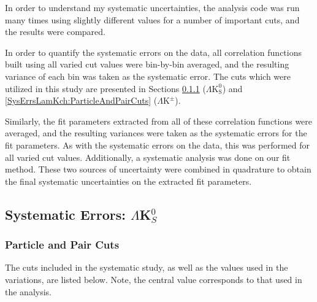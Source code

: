 \documentclass[ALICE,manyauthors]{cernphprep}
\newcommand{\LamKpm}{$\Lambda\mathrm{K^{\pm}}$\xspace}
\newcommand{\LamKs}{$\Lambda\mathrm{K^{0}_{S}}$\xspace}
\begin{document}
In order to understand my systematic uncertainties, the analysis code was run many times using slightly different values for a number of important cuts, and the results were compared.

In order to quantify the systematic errors on the data, all correlation functions built using all varied cut values were bin-by-bin averaged, and the resulting variance of each bin was taken as the systematic error.  The cuts which were utilized in this study are presented in Sections \ref{SysErrsLamK0:ParticleAndPairCuts} (\LamKs) and \ref{SysErrsLamKch:ParticleAndPairCuts} (\LamKpm).


Similarly, the fit parameters extracted from all of these correlation functions were averaged, and the resulting variances were taken as the systematic errors for the fit parameters.
As with the systematic errors on the data, this was performed for all varied cut values.
Additionally, a systematic analysis was done on our fit method.
These two sources of uncertainty were combined in quadrature to obtain the final systematic uncertainties on the extracted fit parameters.



\subsection{Systematic Errors: \texorpdfstring{$\Lambda$K$^{0}_{S}$}{TEXT}}
\label{SysErrsLamK0}

\subsubsection{Particle and Pair Cuts}
\label{SysErrsLamK0:ParticleAndPairCuts}

The cuts included in the systematic study, as well as the values used in the variations, are listed below.  Note, the central value corresponds to that used in the analysis.
\end{document}
